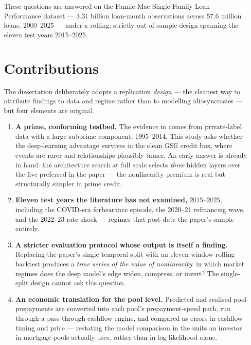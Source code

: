 These questions are answered on the Fannie Mae Single-Family Loan Performance dataset --- 3.31 billion loan-month observations across 57.6 million loans, 2000--2025 --- under a rolling, strictly out-of-sample design spanning the eleven test years 2015--2025.

\section{Contributions}
\label{sec:intro-contributions}

The dissertation deliberately adopts a replication \emph{design} ---
the cleanest way to attribute findings to data and regime rather than
to modelling idiosyncrasies --- but four elements are original.

\begin{enumerate}
\item \textbf{A prime, conforming testbed.}  The evidence in
  \citet{sirignano2021} comes from private-label data with a large
  subprime component, 1995--2014.  This study asks whether the
  deep-learning advantage survives in the clean GSE credit box, where
  events are rarer and relationships plausibly tamer.  An early answer
  is already in hand: the architecture search at full scale selects
  \emph{three} hidden layers over the five preferred in the paper ---
  the nonlinearity premium is real but structurally simpler in prime
  credit.
\item \textbf{Eleven test years the literature has not examined,}
  2015--2025, including the COVID-era forbearance episode, the
  2020--21 refinancing wave, and the 2022--23 rate shock --- regimes
  that post-date the paper's sample entirely.
\item \textbf{A stricter evaluation protocol whose output is itself a
  finding.}  Replacing the paper's single temporal split with an
  eleven-window rolling backtest produces a \emph{time series of the
  value of nonlinearity}: in which market regimes does the deep
  model's edge widen, compress, or invert?  The single-split design
  cannot ask this question.
\item \textbf{An economic translation for the pool level.}  Predicted
  and realised pool prepayments are converted into each pool's
  prepayment-speed path, run through a pass-through cashflow engine,
  and compared as errors in cashflow timing and price --- restating
  the model comparison in the units an investor in mortgage pools
  actually uses, rather than in log-likelihood alone.
\end{enumerate}

